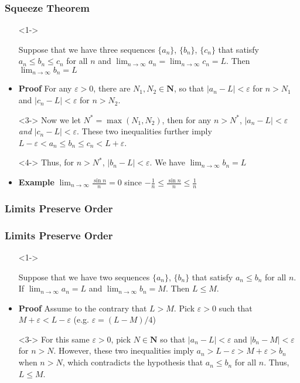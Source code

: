 \documentclass[handout]{beamer}
\begin{document}
\frame
{
  \frametitle{Squeeze Theorem}

  \begin{itemize}
  \item [] <1-> \begin{Theorem}Suppose that we have three sequences $\{a_n\}$, $\{b_n\}$, $\{c_n\}$ that satisfy $a_n\leq b_n\leq c_n$ for all $n$ and $\lim_{n\rightarrow \infty} a_n=\lim_{n\rightarrow \infty} c_n=L.$ Then $\lim_{n\rightarrow \infty} b_n=L$
  \end{Theorem}
  
  \item<2-> \textbf{Proof} For any $\varepsilon>0$, there are $N_1, N_2\in \mathbf{N}$, so that $|a_n-L|<\varepsilon$ for $n>N_1$ and $|c_n-L|<\varepsilon$ for $n>N_2$. 
        \item[]<3-> Now we let $N^*=\max(N_1, N_2)$, then for any $n>N^*$, $|a_n-L|<\varepsilon$ \textit{ and } $|c_n-L|<\varepsilon$. These two inequalities further imply $L-\varepsilon <a_n\leq b_n\leq c_n<L+\varepsilon$. 

        \item[]<4-> Thus, for $n>N^*$, $|b_n-L|<\varepsilon$. We have $\lim_{n\rightarrow \infty} b_n=L$
        

  \item <5->  \textbf{Example} $\lim_{n\rightarrow \infty} \frac{\sin n}{n}=0$ since $ -\frac{1}{n}\leq \frac{\sin n}{n}\leq \frac{1}{n}$  
             
  \end{itemize}
}



\subsubsection{Limits Preserve Order}

\frame
{
  \frametitle{Limits Preserve Order}

  \begin{itemize}
  \item [] <1-> \begin{Theorem}Suppose that we have two sequences $\{a_n\}$, $\{b_n\}$ that satisfy $a_n\leq b_n$ for all $n$. If $\lim_{n\rightarrow \infty} a_n=L$ and $\lim_{n\rightarrow \infty} b_n=M.$ Then $L\leq M$.
  \end{Theorem}
  
  \item<2-> \textbf{Proof} Assume to the contrary that $L>M$. Pick $\varepsilon>0$ such that $M+\varepsilon< L-\varepsilon$ (e.g. $\varepsilon=(L-M)/4$)
  
     \item[]<3-> For this same $\varepsilon>0$, pick $N\in\mathbf{N}$ so that $|a_n-L|<\varepsilon$  and $|b_n-M|<\varepsilon$ for $n>N$.  However, these two inequalities imply $a_n>L-\varepsilon>M+\varepsilon>b_n$ when $n>N$, which contradicts the hypothesis that $a_n\leq b_n$ for all $n$. Thus, $L\leq M$. 
                  
  \end{itemize}
}
\end{document}
